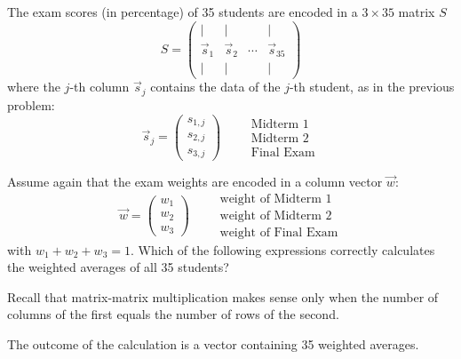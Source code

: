 \documentclass{ximera}
\author{Tae Eun Kim}
\begin{document}
\begin{exercise}
  The exam scores (in percentage) of 35 students are encoded in a
  $3 \times 35$ matrix $S$
  \[
    S =
    \begin{pmatrix}
      |&|&&| \\
      \vec{s}_1 & \vec{s}_2 & \cdots & \vec{s}_{35} \\
      |&|&&|
    \end{pmatrix}
  \]
  where the $j$-th column $\vec{s}_j$ contains the data of the $j$-th
  student, as in the previous problem:
  \[
    \vec{s}_j =
    \begin{pmatrix}
      s_{1,j}\\ s_{2,j} \\ s_{3,j}
    \end{pmatrix}
    \qquad
    \begin{array}{l}
      \text{Midterm 1}\\
      \text{Midterm 2}\\
      \text{Final Exam}
    \end{array}
  \]

  Assume again that the exam weights are encoded in a column
  vector $\vec{w}$:
  \[
    \vec{w} =
    \begin{pmatrix}
      w_1\\ w_2\\ w_3
    \end{pmatrix}
    \qquad
    \begin{array}{l}
      \text{weight of Midterm 1}\\
      \text{weight of Midterm 2}\\
      \text{weight of Final Exam}
    \end{array}
  \]
  with $w_1 + w_2 + w_3 = 1$. Which of the following expressions
  correctly calculates the weighted averages of all 35 students?
  \begin{multipleChoice}
  \end{multipleChoice}
  \begin{feedback}[incorrect]
    Recall that matrix-matrix multiplication makes sense only when the
    number of columns of the first equals the number of rows of the
    second.
  \end{feedback}
  \begin{prompt}
    The outcome of the calculation is a  vector containing
    35 weighted averages.
  \end{prompt}
\end{exercise}
\end{document}
